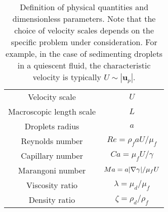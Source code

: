 
\begin{table}
    \centering
\begin{tabular}{|c|c|}\hline
    Velocity scale & $U$ \\
    Macroscopic length scale & $L$ \\
    Droplets radius & $a$ \\
    Reynolds number & $Re = \rho_f a U / \mu_f$   \\
    Capillary number & $Ca = \mu_f U / \gamma$ \\
    Marangoni number & $Ma =  a|\mathbf{\nabla}\gamma| / \mu_f U$ \\\hline
Viscosity ratio & $\lambda = \mu_d / \mu_f$ \\
Density ratio & $\zeta = \rho_d / \rho_f$ \\
\hline
    \end{tabular}
    \caption{Definition of physical quantities and dimensionless parameters.
    Note that the choice of velocity scales depends on the specific problem under consideration. 
    For example, in the case of sedimenting droplets in a quiescent fluid, the characteristic velocity is typically $U \sim |\textbf{u}_p|$.}
    \label{tab:dimensionless_para}
\end{table}

